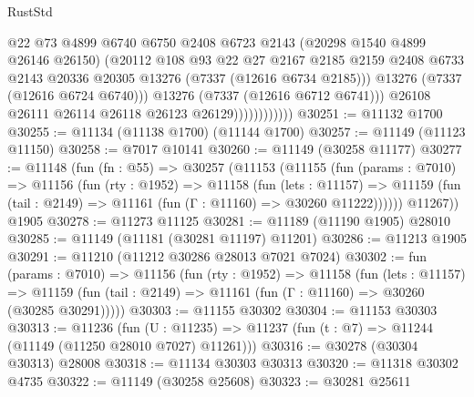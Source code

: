 \begin{lexlean}{RustStd}
\begin{coremodule}
                                @22
                                @73
                                @4899
                                @6740
                                @6750
                                @2408
                                @6723
                                @2143
                                (@20298 @1540 @4899 @26146 @26150)
                                (@20112
                                  @108
                                  @93
                                  @22
                                  @27
                                  @2167
                                  @2185
                                  @2159
                                  @2408
                                  @6733
                                  @2143
                                  @20336
                                  @20305
                                  @13276
                                  (@7337 (@12616 @6734 @2185)))
                                @13276
                                (@7337 (@12616 @6724 @6740)))
                              @13276
                              (@7337 (@12616 @6712 @6741)))
                            @26108
                            @26111
                            @26114
                            @26118
                            @26123
                            @26129))))))))))))
@30251 := @11132 @1700
@30255 := @11134 (@11138 @1700) (@11144 @1700)
@30257 := @11149 (@11123 @11150)
@30258 := @7017 @10141
@30260 := @11149 (@30258 @11177)
@30277 := @11148
    (fun (fn : @55) =>
    @30257
      (@11153
        (@11155
          (fun (params : @7010) =>
          @11156
            (fun (rty : @1952) =>
            @11158
              (fun (lets : @11157) =>
              @11159 (fun (tail : @2149) => @11161 (fun (Γ : @11160) => @30260 @11222))))))
        @11267))
    @1905
@30278 := @11273 @11125
@30281 := @11189 (@11190 @1905) @28010
@30285 := @11149 (@11181 (@30281 @11197) @11201)
@30286 := @11213 @1905
@30291 := @11210 (@11212 @30286 @28013 @7021 @7024)
@30302 := fun (params : @7010) =>
  @11156
    (fun (rty : @1952) =>
    @11158
      (fun (lets : @11157) =>
      @11159 (fun (tail : @2149) => @11161 (fun (Γ : @11160) => @30260 (@30285 @30291)))))
@30303 := @11155 @30302
@30304 := @11153 @30303
@30313 := @11236
    (fun (U : @11235) => @11237 (fun (t : @7) => @11244 (@11149 (@11250 @28010 @7027) @11261)))
@30316 := @30278 (@30304 @30313) @28008
@30318 := @11134 @30303 @30313
@30320 := @11318 @30302 @4735
@30322 := @11149 (@30258 @25608)
@30323 := @30281 @25611

\end{coremodule}
\end{lexlean}
